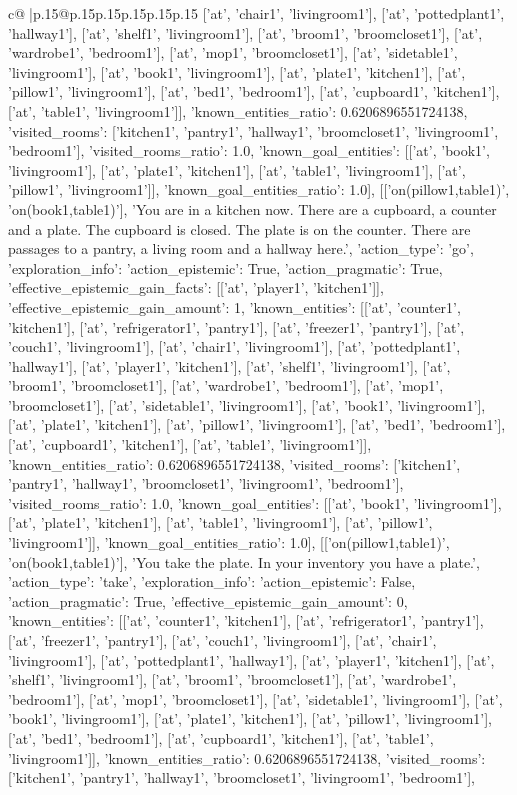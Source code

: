 \documentclass{article}
\begin{document}
{\begin{supertabular}{c@{$\;$}|p{.15\linewidth}@{}p{.15\linewidth}p{.15\linewidth}p{.15\linewidth}p{.15\linewidth}p{.15\linewidth}}
{{{['at', 'chair1', 'livingroom1'], ['at', 'pottedplant1', 'hallway1'], ['at', 'shelf1', 'livingroom1'], ['at', 'broom1', 'broomcloset1'], ['at', 'wardrobe1', 'bedroom1'], ['at', 'mop1', 'broomcloset1'], ['at', 'sidetable1', 'livingroom1'], ['at', 'book1', 'livingroom1'], ['at', 'plate1', 'kitchen1'], ['at', 'pillow1', 'livingroom1'], ['at', 'bed1', 'bedroom1'], ['at', 'cupboard1', 'kitchen1'], ['at', 'table1', 'livingroom1']], 'known_entities_ratio': 0.6206896551724138, 'visited_rooms': ['kitchen1', 'pantry1', 'hallway1', 'broomcloset1', 'livingroom1', 'bedroom1'], 'visited_rooms_ratio': 1.0, 'known_goal_entities': [['at', 'book1', 'livingroom1'], ['at', 'plate1', 'kitchen1'], ['at', 'table1', 'livingroom1'], ['at', 'pillow1', 'livingroom1']], 'known_goal_entities_ratio': 1.0}}], [['on(pillow1,table1)', 'on(book1,table1)'], 'You are in a kitchen now. There are a cupboard, a counter and a plate. The cupboard is closed. The plate is on the counter. There are passages to a pantry, a living room and a hallway here.', {'action_type': 'go', 'exploration_info': {'action_epistemic': True, 'action_pragmatic': True, 'effective_epistemic_gain_facts': [['at', 'player1', 'kitchen1']], 'effective_epistemic_gain_amount': 1, 'known_entities': [['at', 'counter1', 'kitchen1'], ['at', 'refrigerator1', 'pantry1'], ['at', 'freezer1', 'pantry1'], ['at', 'couch1', 'livingroom1'], ['at', 'chair1', 'livingroom1'], ['at', 'pottedplant1', 'hallway1'], ['at', 'player1', 'kitchen1'], ['at', 'shelf1', 'livingroom1'], ['at', 'broom1', 'broomcloset1'], ['at', 'wardrobe1', 'bedroom1'], ['at', 'mop1', 'broomcloset1'], ['at', 'sidetable1', 'livingroom1'], ['at', 'book1', 'livingroom1'], ['at', 'plate1', 'kitchen1'], ['at', 'pillow1', 'livingroom1'], ['at', 'bed1', 'bedroom1'], ['at', 'cupboard1', 'kitchen1'], ['at', 'table1', 'livingroom1']], 'known_entities_ratio': 0.6206896551724138, 'visited_rooms': ['kitchen1', 'pantry1', 'hallway1', 'broomcloset1', 'livingroom1', 'bedroom1'], 'visited_rooms_ratio': 1.0, 'known_goal_entities': [['at', 'book1', 'livingroom1'], ['at', 'plate1', 'kitchen1'], ['at', 'table1', 'livingroom1'], ['at', 'pillow1', 'livingroom1']], 'known_goal_entities_ratio': 1.0}}], [['on(pillow1,table1)', 'on(book1,table1)'], 'You take the plate. In your inventory you have a plate.', {'action_type': 'take', 'exploration_info': {'action_epistemic': False, 'action_pragmatic': True, 'effective_epistemic_gain_amount': 0, 'known_entities': [['at', 'counter1', 'kitchen1'], ['at', 'refrigerator1', 'pantry1'], ['at', 'freezer1', 'pantry1'], ['at', 'couch1', 'livingroom1'], ['at', 'chair1', 'livingroom1'], ['at', 'pottedplant1', 'hallway1'], ['at', 'player1', 'kitchen1'], ['at', 'shelf1', 'livingroom1'], ['at', 'broom1', 'broomcloset1'], ['at', 'wardrobe1', 'bedroom1'], ['at', 'mop1', 'broomcloset1'], ['at', 'sidetable1', 'livingroom1'], ['at', 'book1', 'livingroom1'], ['at', 'plate1', 'kitchen1'], ['at', 'pillow1', 'livingroom1'], ['at', 'bed1', 'bedroom1'], ['at', 'cupboard1', 'kitchen1'], ['at', 'table1', 'livingroom1']], 'known_entities_ratio': 0.6206896551724138, 'visited_rooms': ['kitchen1', 'pantry1', 'hallway1', 'broomcloset1', 'livingroom1', 'bedroom1'], }}}
\end{supertabular}}
\end{document}
